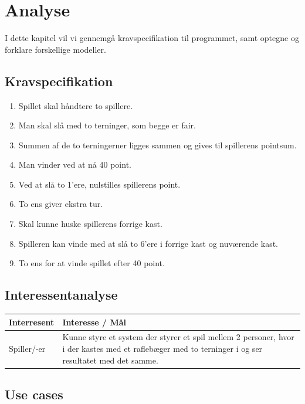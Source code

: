 \chapter{Analyse}

I dette kapitel vil vi gennemgå kravspecifikation til programmet, samt optegne og forklare forskellige modeller.


\section{Kravspecifikation}

\begin{enumerate}
    \item Spillet skal håndtere to spillere.
    \item Man skal slå med to terninger, som begge er fair.
    \item Summen af de to terningerner ligges sammen og gives til spillerens pointsum.
    \item Man vinder ved at nå 40 point.
    \item Ved at slå to 1'ere, nulstilles spillerens point.
    \item To ens giver ekstra tur.
    \item Skal kunne huske spillerens forrige kast.
    \item Spilleren kan vinde med at slå to 6'ere i forrige kast og nuværende kast.
    \item To ens for at vinde spillet efter 40 point.
\end{enumerate}

\section{Interessentanalyse}

\begin{center}
    \begin{tabular}{ | l | p{13cm} |}
    \hline
    \textbf{Interresent} & \textbf{Interesse / Mål} \\ \hline
    Spiller/-er & Kunne styre et system der styrer et spil mellem 2 personer, hvor i der kastes med et raflebæger med to terninger i og ser resultatet med det samme. \\ \hline
    \hline
    \end{tabular}
\end{center}

\section{Use cases}

